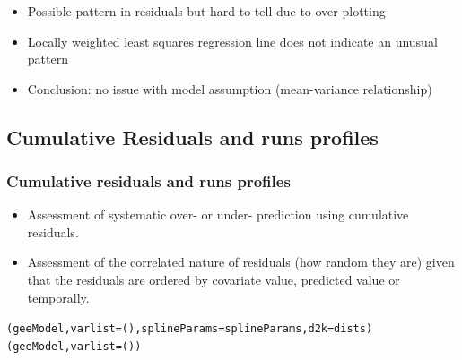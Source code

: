 \begin{frame}
\frametitle{}
\begin{itemize}
\item Possible pattern in residuals but hard to tell due to over-plotting
\item Locally weighted least squares regression line does not indicate an unusual pattern
\pause
\bigskip
\item Conclusion: no issue with model assumption (mean-variance relationship)
\end{itemize}
\end{frame}

\subsection{Cumulative Residuals and runs profiles}

\begin{frame}[fragile]
\frametitle{Cumulative residuals and runs profiles}
\begin{itemize}
\item Assessment of systematic over- or under- prediction using cumulative residuals.
\item Assessment of the correlated nature of residuals (how random they are) given that the residuals are ordered by covariate value, predicted value or temporally.
\end{itemize}

\begin{knitrout}\footnotesize
{}\color{fgcolor}\begin{kframe}
\begin{alltt}
(geeModel, varlist=(), splineParams=splineParams, d2k=dists)
(geeModel, varlist=())
\end{alltt}
\end{kframe}
\end{knitrout}

\end{frame}

